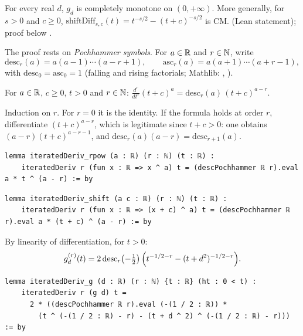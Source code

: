 \begin{theorem}\label{ch2:thm:dip}
For every real $d$, $g_d$ is completely monotone on $(0,+\infty)$. More generally, for $s>0$ and $c\ge0$,
$\mathrm{shiftDiff}_{s,c}(t)=t^{-s/2}-(t+c)^{-s/2}$ is CM. \tierA{} (Lean statement); proof below \tierC.
\end{theorem}

The proof rests on \emph{Pochhammer symbols}. For $a\in\mathbb{R}$ and $r\in\mathbb{N}$, write
\[\mathrm{desc}_r(a)=a(a-1)\cdots(a-r+1),\qquad \mathrm{asc}_r(a)=a(a+1)\cdots(a+r-1),\]
with $\mathrm{desc}_0=\mathrm{asc}_0=1$ (falling and rising factorials; Mathlib: ,
).

\begin{lemma}\label{ch2:lem:pochder}
For $a\in\mathbb{R}$, $c\ge0$, $t>0$ and $r\in\mathbb{N}$:
$\displaystyle\frac{d^r}{dt^r}(t+c)^a=\mathrm{desc}_r(a)\,(t+c)^{a-r}$.
\end{lemma}
\begin{humanproof}
Induction on $r$. For $r=0$ it is the identity. If the formula holds at order $r$, differentiate $(t+c)^{a-r}$, which is
legitimate since $t+c>0$: one obtains $(a-r)(t+c)^{a-r-1}$, and $\mathrm{desc}_r(a)(a-r)=\mathrm{desc}_{r+1}(a)$.
\end{humanproof}
\begin{leanbox}
\begin{lstlisting}[style=chdeux]
lemma iteratedDeriv_rpow (a : ℝ) (r : ℕ) (t : ℝ) :
    iteratedDeriv r (fun x : ℝ => x ^ a) t = (descPochhammer ℝ r).eval a * t ^ (a - r) := by
\end{lstlisting}
\begin{lstlisting}[style=chdeux]
lemma iteratedDeriv_shift (a c : ℝ) (r : ℕ) (t : ℝ) :
    iteratedDeriv r (fun x : ℝ => (x + c) ^ a) t = (descPochhammer ℝ r).eval a * (t + c) ^ (a - r) := by
\end{lstlisting}
\end{leanbox}

By linearity of differentiation, for $t>0$:
\begin{equation}\label{ch2:eq:gder}
g_d^{(r)}(t)=2\,\mathrm{desc}_r\!\left(-\tfrac12\right)\Bigl(t^{-1/2-r}-(t+d^2)^{-1/2-r}\Bigr).
\end{equation}
\begin{leanbox}
\begin{lstlisting}[style=chdeux]
lemma iteratedDeriv_g (d : ℝ) (r : ℕ) {t : ℝ} (ht : 0 < t) :
    iteratedDeriv r (g d) t =
      2 * ((descPochhammer ℝ r).eval (-(1 / 2 : ℝ)) *
        (t ^ (-(1 / 2 : ℝ) - r) - (t + d ^ 2) ^ (-(1 / 2 : ℝ) - r))) := by
\end{lstlisting}
\end{leanbox}

